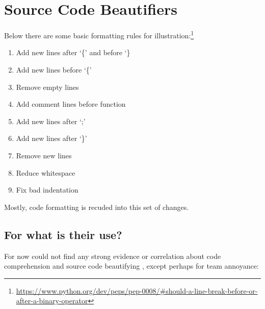 

%


\chapter{Source Code Beautifiers}
\label{source_code_beautifiers}


Below there are some basic formatting rules for
illustration:\footnote{\url{https://www.python.org/dev/peps/pep-0008/#should-a-line-break-before-or-after-a-binary-operator}}

\medskip
\begin{enumerate}
    \item Add new lines after `\{' and before `\}
    \item Add new lines before `\{'
    \item Remove empty lines
    \item Add comment lines before function
    \item Add new lines after `;'
    \item Add new lines after `\}'
    \item Remove new lines
    \item Reduce whitespace
    \item Fix bad indentation
\end{enumerate}
\begin{flushright}\textcite{prettyPrinter}\end{flushright}

Mostly,
code formatting is recuded into this set of changes.



\section{For what is their use?}

For now could not find any strong evidence or correlation about code
comprehension and source code beautifying \cite{improvingCodeReadability},
except perhaps for team annoyance:

